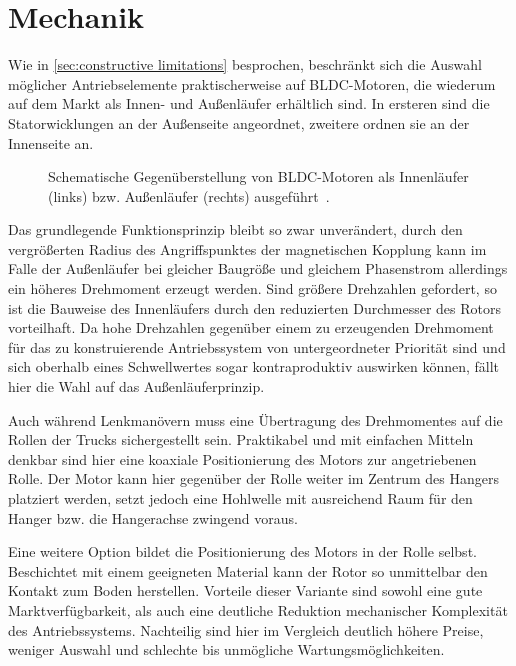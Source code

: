 \chapter{Mechanik}
	Wie in \cref{sec:constructive limitations} besprochen, beschränkt sich die Auswahl möglicher Antriebselemente praktischerweise auf BLDC-Motoren, die wiederum auf dem Markt als Innen- und Außenläufer erhältlich sind.
	In ersteren sind die Statorwicklungen an der Außenseite angeordnet, zweitere ordnen sie an der Innenseite an.
	\begin{figure}[h]
		\centering
		
		\caption[Gegenüberstellung von Innenläufer und Außenläufer]{Schematische Gegenüberstellung von BLDC-Motoren als Innenläufer (links) bzw. Außenläufer (rechts) ausgeführt~\cite{inrunner.outrunner.2022}.}%
		\label{fig:inrunner outrunner}
	\end{figure}
	Das grundlegende Funktionsprinzip bleibt so zwar unverändert, durch den vergrößerten Radius des Angriffspunktes der magnetischen Kopplung kann im Falle der Außenläufer bei gleicher Baugröße und gleichem Phasenstrom allerdings ein höheres Drehmoment erzeugt werden.
	Sind größere Drehzahlen gefordert, so ist die Bauweise des Innenläufers durch den reduzierten Durchmesser des Rotors vorteilhaft.
	Da hohe Drehzahlen gegenüber einem zu erzeugenden Drehmoment für das zu konstruierende Antriebssystem von untergeordneter Priorität sind und sich oberhalb eines Schwellwertes sogar kontraproduktiv auswirken können, fällt hier die Wahl auf das Außenläuferprinzip.\par\medskip
	Auch während Lenkmanövern muss eine Übertragung des Drehmomentes auf die Rollen der Trucks sichergestellt sein.
	Praktikabel und mit einfachen Mitteln denkbar sind hier eine koaxiale Positionierung des Motors zur angetriebenen Rolle.
	Der Motor kann hier gegenüber der Rolle weiter im Zentrum des Hangers platziert werden, setzt jedoch eine Hohlwelle mit ausreichend Raum für den Hanger bzw. die Hangerachse zwingend voraus.

	Eine weitere Option bildet die Positionierung des Motors in der Rolle selbst.
	Beschichtet mit einem geeigneten Material kann der Rotor so unmittelbar den Kontakt zum Boden herstellen.
	Vorteile dieser Variante sind sowohl eine gute Marktverfügbarkeit, als auch eine deutliche Reduktion mechanischer Komplexität des Antriebssystems.
	Nachteilig sind hier im Vergleich deutlich höhere Preise, weniger Auswahl und schlechte bis unmögliche Wartungsmöglichkeiten.

